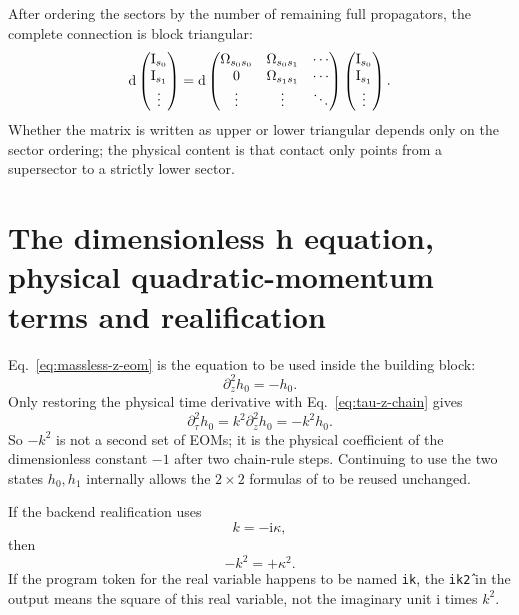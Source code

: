 \documentclass[11pt,a4paper]{article}
\newcommand{\dd}{\mathrm d}
\newcommand{\ii}{\mathrm i}
\begin{document}
After ordering the sectors by the number of remaining full propagators, the complete connection is block triangular:
\begin{equation}
 \dd
 \begin{pmatrix}
 \bm{\text I}_{s_0}\\\bm{\text I}_{s_1}\\\vdots
 \end{pmatrix}
 =\dd
 \begin{pmatrix}
 \Omega_{s_0s_0}&\Omega_{s_0s_1}&\cdots\\
 0&\Omega_{s_1s_1}&\cdots\\
 \vdots&\vdots&\ddots
 \end{pmatrix}
 \begin{pmatrix}
 \bm{\text I}_{s_0}\\\bm{\text I}_{s_1}\\\vdots
 \end{pmatrix}.
 \label{eq:block-triangular-de}
\end{equation}
Whether the matrix is written as upper or lower triangular depends only on the sector ordering; the physical content is that contact only points from a supersector to a strictly lower sector.

\section{The dimensionless h equation, physical quadratic-momentum terms and realification}
\label{sec:physical-k2}

Eq.~\eqref{eq:massless-z-eom} is the equation to be used inside the building block:
\begin{equation}
 \partial_z^2h_0=-h_0.
\end{equation}
Only restoring the physical time derivative with Eq.~\eqref{eq:tau-z-chain} gives
\begin{equation}
 \boxed{
 \partial_\tau^2h_0
 =k^2\partial_z^2h_0
 =-k^2h_0.
 }
 \label{eq:physical-second-derivative}
\end{equation}
So $-k^2$ is not a second set of EOMs; it is the physical coefficient of the dimensionless constant $-1$ after two chain-rule steps. Continuing to use the two states $h_0,h_1$ internally allows the $2\times2$ formulas of \cite{Chen:2023eic} to be reused unchanged.

If the backend realification uses
\begin{equation}
 k=-\ii\kappa,
\end{equation}
then
\begin{equation}
 -k^2=+\kappa^2.
\end{equation}
If the program token for the real variable happens to be named \texttt{ik}, the \texttt{ik\^2} in the output means the square of this real variable, not the imaginary unit $\ii$ times $k^2$.
\end{document}
